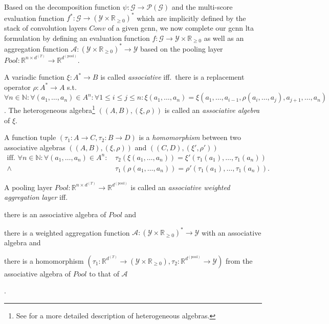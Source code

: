 Based on the decomposition function $\psi: \mathcal{G} \to \mathcal{P}(\mathcal{G})$ and the multi-score evaluation function $f^{*}: \mathcal{G} \to {(\mathcal{Y} \times \mathbb{R}_{\geq 0})}^{*}$ which are implicitly defined by the stack of convolution layers $\mathit{Conv}$ of a given \ac{gcnn}, we now complete our \ac{gcnn} \ac{lta} formulation by defining an evaluation function $f: \mathcal{G} \to \mathcal{Y} \times \mathbb{R}_{\geq 0}$ as well as an aggregation function $\mathcal{A}: {(\mathcal{Y} \times \mathbb{R}_{\geq 0})}^{*} \to \mathcal{Y}$ based on the pooling layer $\mathit{Pool}: \mathbb{R}^{n \times d^{(T)}} \to \mathbb{R}^{d^{(\mathrm{pool})}}$.
\begin{defn}\label{defn:ltag:assoc-algebra}
	A variadic function $\xi: A^{*} \to B$ is called \textit{associative} iff.\ there is a replacement operator $\rho: A^{*} \to A$ s.t.\ $\forall n \in \mathbb{N}: \forall (a_1, \dots, a_n) \in A^n: \forall {1 \leq i \leq j \leq n}: \xi(a_1, \dots, a_n) = \xi(a_1, \dots, a_{i-1}, \rho(a_i, \dots, a_j), a_{j+1}, \dots, a_n)$.
	The heterogeneous algebra\footnote{
		See \citet{Birkhoff1970} for a more detailed description of heterogeneous algebras.
	} $((A, B), (\xi, \rho))$ is called an \textit{associative algebra} of $\xi$.
\end{defn}
\begin{defn}\label{defn:ltag:assoc-algebra-homomorphism}
	A function tuple $(\tau_1: A \to C, \tau_2: B \to D)$ is a \textit{homomorphism} between two associative algebras $((A, B), (\xi, \rho))$ and $((C, D), (\xi', \rho'))$
	\begin{align*}
		\text{iff.\ }
		\forall n \in \mathbb{N}: \forall (a_1, \dots, a_n) \in A^n:
		\, &\tau_2(\xi(a_1, \dots, a_n)) = \xi'(\tau_1(a_1), \dots, \tau_1(a_n)) \\
		\land\, &\tau_1(\rho(a_1, \dots, a_n)) = \rho'(\tau_1(a_1), \dots, \tau_1(a_n)) %
		\text{.}
	\end{align*}
\end{defn}
\begin{defn}\label{defn:ltag:assoc-aggregation-pooling}
	A pooling layer $\mathit{Pool}: \mathbb{R}^{n \times d^{(T)}} \to \mathbb{R}^{d^{(\mathrm{pool})}}$ is called an \textit{associative weighted aggregation layer} iff.
	\begin{enumerate*}[label={\circled{\small\arabic*}}]
		\item there is an associative algebra of $\mathit{Pool}$ and
		\item there is a weighted aggregation function $\mathcal{A}: {(\mathcal{Y} \times \mathbb{R}_{\geq 0})}^{*} \to \mathcal{Y}$ with an associative algebra and
		\item there is a homomorphism $(\tau_{1}: \mathbb{R}^{d^{(T)}} \to (\mathcal{Y} \times \mathbb{R}_{\geq 0}), \tau_{2}: \mathbb{R}^{d^{(\mathrm{pool})}} \to \mathcal{Y})$ from the associative algebra of $\mathit{Pool}$ to that of $\mathcal{A}$
	\end{enumerate*}.
\end{defn}
